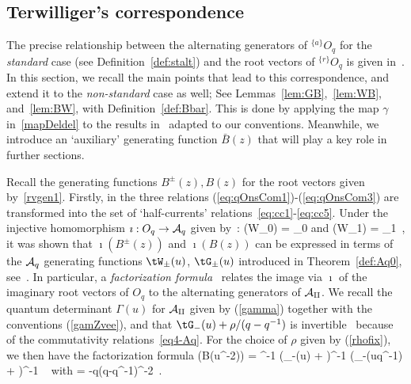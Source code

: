 \documentclass[11pt]{amsart}
\numberwithin{equation}{section}
\numberwithin{equation}{section}
\begin{document}
\subsection{Terwilliger's correspondence}\label{sec:Tercor}
The precise relationship between the alternating generators of $^{\{a\}}O_q$ for the {\it standard} case (see Definition~\ref{def:stalt}) 
 and the root vectors
 of $^{\{r\}}O_q$ is given in~\cite[Secs.\,11\,\&\,12]{Ter21b}. In this section, we recall the main points that lead to this correspondence, and extend it to the {\it non-standard} case as well; See Lemmas~\ref{lem:GB},~\ref{lem:WB}, and~\ref{lem:BW}, with Definition~\ref{def:Bbar}. This is done by applying the map $\gamma$ in~\eqref{mapDeldel} to the results in~\cite[Sec.\,9]{Ter21b} adapted to our conventions. Meanwhile, we introduce an `auxiliary' generating function ${\bar B}(z)$ that will play a key role in further sections.


Recall the generating functions $B^\pm(z),B(z)$ for the root vectors given by~\eqref{rvgen1}. Firstly, in \cite[Sec.\,5]{Ter21b} the three relations (\ref{eq:qOnsCom1})-(\ref{eq:qOnsCom3}) are transformed into the set of `half-currents'  relations~\eqref{eq:cc1}-\eqref{eq:cc5}. Under the injective homomorphism $\imath: O_q \rightarrow {\cal A}_q$ given by~\cite[Lem.\,6.8]{Ter21b}:
\beqa
\imath(W_0) = \tW_0 \qquad \mbox{and} \qquad \imath(W_1) = \tW_1\ ,
\eeqa
it was shown that $\imath(B^\pm(z))$ and $\imath(B(z))$ can be expressed in terms of the  ${\cal A}_q$ generating functions ${\tW}_\pm(u)$, ${\tG}_\pm(u)$ introduced in Theorem~\ref{def:Aq0}, see~\cite[Props.\,9.6,~9.7\,\&\,Cor.\,10.5]{Ter21b}.
In particular, a {\it factorization formula}~\cite[Thm.\,10.1 \& 
Cor.\,10.5]{Ter21b} relates
the image via  $\imath$ of the imaginary root vectors of $O_q$ to the alternating generators of $\cal A_q$. We recall the quantum determinant $\Gamma(u)$ for $\cal A_q$ given by  (\ref{gamma}) together with the conventions (\ref{gamZvee}), and that  ${\tG}_-(u) + \rho/(q-q^{-1})$ is invertible~\cite[Lem.\,4.1]{Ter21d} because of the commutativity relations~\eqref{eq4-Aq}.
For the choice of $\rho$ given by (\ref{rhofix}), we then have the  factorization formula
\beqa
\imath(B(u^{-2})) = \xi^{-1}  \left({\tG}_-(u) + \right)^{-1} \left({\tG}_-(uq^{-1}) + \right)^{-1} 	 \ \label{BinGGZ}
\eeqa
with  
\beqa
\xi = -q(q-q^{-1})\rho^{-2}\ .\label{xi}
\eeqa
\end{document}

